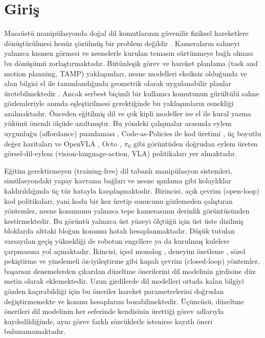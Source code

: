 \documentclass[preprint,12pt]{elsarticle}
\begin{document}
\hypertarget{giriux15f}{%
\section{Giriş}\label{giriux15f}}

Masaüstü manipülasyonda doğal dil komutlarının güvenilir fiziksel hareketlere dönüştürülmesi henüz çözülmüş bir problem değildir \cite{billard2019trends,kroemer2021review}. Kameraların sahneyi yalnızca kısmen görmesi ve nesnelerle kurulan temasın sürtünmeye bağlı olması bu dönüşümü zorlaştırmaktadır. Bütünleşik görev ve hareket planlama (task and motion planning, TAMP) yaklaşımları, nesne modelleri eksiksiz olduğunda ve alan bilgisi el ile tanımlandığında geometrik olarak uygulanabilir planlar üretebilmektedir \cite{garrett2021tamp}. Ancak serbest biçimli bir kullanıcı komutunun gürültülü sahne gözlemleriyle anında eşleştirilmesi gerektiğinde bu yaklaşımların esnekliği azalmaktadır. Önceden eğitilmiş dil ve çok kipli modeller ise el ile kural yazma yükünü önemli ölçüde azaltmıştır. Bu yöndeki çalışmalar arasında eylem uygunluğu (affordance) puanlaması \cite{ahn2022saycan}, Code-as-Policies ile kod üretimi \cite{liang2023cap,singh2023progprompt}, üç boyutlu değer haritaları \cite{huang2023voxposer} ve OpenVLA \cite{kim2024openvla}, Octo \cite{ghosh2024octo}, \(\pi_0\) \cite{black2025pi0} gibi görüntüden doğrudan eylem üreten görsel-dil-eylem (vision-language-action, VLA) politikaları yer almaktadır.

Eğitim gerektirmeyen (training-free) dil tabanlı manipülasyon sistemleri, simülasyondaki yapay kavrama bağları ve nesne ışınlama gibi kolaylıklar kaldırıldığında üç tür hatayla karşılaşmaktadır. Birincisi, açık çevrim (open-loop) kod politikaları, yani kodu bir kez üretip sonucunu gözlemeden çalıştıran yöntemler, nesne konumunu yalnızca tepe kamerasının derinlik görüntüsünden kestirmektedir. Bu görüntü yalnızca üst yüzeyi ölçtüğü için üst üste dizilmiş bloklarda alttaki bloğun konumu hatalı hesaplanmaktadır. Düşük tutulan varsayılan geçiş yüksekliği de robotun engellere ya da kurulmuş kulelere çarpmasına yol açmaktadır. İkincisi, içsel monolog \cite{huang2022inner}, deneyim özetleme \cite{liu2023reflect}, sözel pekiştirme \cite{shinn2023reflexion} ve yinelemeli öz-iyileştirme \cite{madaan2023selfrefine} gibi kapalı çevrim (closed-loop) yöntemler, başarısız denemelerden çıkarılan düzeltme önerilerini dil modelinin girdisine düz metin olarak eklemektedir. Uzun girdilerde dil modelleri ortada kalan bilgiyi gözden kaçırabildiği için \cite{liu2024lost} bu öneriler hareket parametrelerini doğrudan değiştirmemekte ve konum hesaplarını bozabilmektedir. Üçüncüsü, düzeltme önerileri dil modelinin her seferinde kendisinin ürettiği görev adlarıyla kaydedildiğinde, aynı görev farklı sözcüklerle istenirse kayıtlı öneri bulunamamaktadır.
\end{document}
